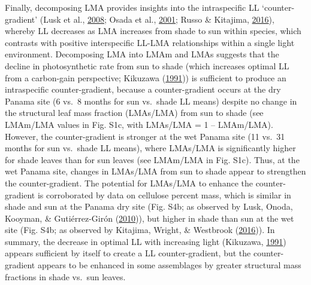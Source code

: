 \documentclass[12pt,]{article}
\theoremstyle{definition}
\theoremstyle{definition}
\theoremstyle{definition}
\theoremstyle{remark}
\begin{document}
Finally, decomposing LMA provides insights into the intraspecific LL
`counter-gradient' (Lusk et al., \protect\hyperlink{ref-Lusk2008}{2008};
Osada et al., \protect\hyperlink{ref-Osada2001}{2001}; Russo \&
Kitajima, \protect\hyperlink{ref-Russo2016}{2016}), whereby LL decreases
as LMA increases from shade to sun within species, which contrasts with
positive interspecific LL-LMA relationships within a single light
environment. Decomposing LMA into LMAm and LMAs suggests that the
decline in photosynthetic rate from sun to shade (which increases
optimal LL from a carbon-gain perspective; Kikuzawa
(\protect\hyperlink{ref-Kikuzawa1991}{1991})) is sufficient to produce
an intraspecific counter-gradient, because a counter-gradient occurs at
the dry Panama site (6 vs.~8 months for sun vs.~shade LL means) despite
no change in the structural leaf mass fraction (LMAs/LMA) from sun to
shade (see LMAm/LMA values in Fig. S1c, with LMAs/LMA = 1 -- LMAm/LMA).
However, the counter-gradient is stronger at the wet Panama site (11
vs.~31 months for sun vs.~shade LL means), where LMAs/LMA is
significantly higher for shade leaves than for sun leaves (see LMAm/LMA
in Fig. S1c). Thus, at the wet Panama site, changes in LMAs/LMA from sun
to shade appear to strengthen the counter-gradient. The potential for
LMAs/LMA to enhance the counter-gradient is corroborated by data on
cellulose percent mass, which is similar in shade and sun at the Panama
dry site (Fig. S4b; as observed by Lusk, Onoda, Kooyman, \&
Gutiérrez-Girón (\protect\hyperlink{ref-Lusk2010}{2010})), but higher in
shade than sun at the wet site (Fig. S4b; as observed by Kitajima,
Wright, \& Westbrook (\protect\hyperlink{ref-Kitajima2016}{2016})). In
summary, the decrease in optimal LL with increasing light (Kikuzawa,
\protect\hyperlink{ref-Kikuzawa1991}{1991}) appears sufficient by itself
to create a LL counter-gradient, but the counter-gradient appears to be
enhanced in some assemblages by greater structural mass fractions in
shade vs.~sun leaves.
\end{document}
